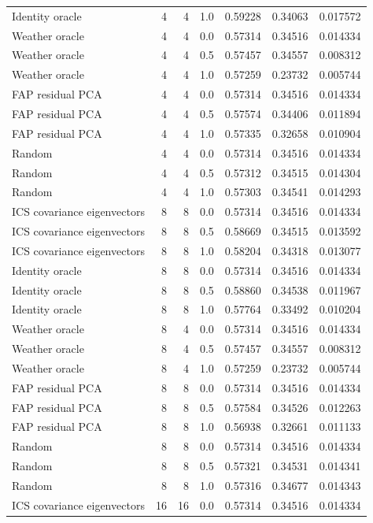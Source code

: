 \begin{tabular}{lrrrrrr}
Identity oracle & 4 & 4 & 1.0 & 0.59228 & 0.34063 & 0.017572 \\
Weather oracle & 4 & 4 & 0.0 & 0.57314 & 0.34516 & 0.014334 \\
Weather oracle & 4 & 4 & 0.5 & 0.57457 & 0.34557 & 0.008312 \\
Weather oracle & 4 & 4 & 1.0 & 0.57259 & 0.23732 & 0.005744 \\
FAP residual PCA & 4 & 4 & 0.0 & 0.57314 & 0.34516 & 0.014334 \\
FAP residual PCA & 4 & 4 & 0.5 & 0.57574 & 0.34406 & 0.011894 \\
FAP residual PCA & 4 & 4 & 1.0 & 0.57335 & 0.32658 & 0.010904 \\
Random & 4 & 4 & 0.0 & 0.57314 & 0.34516 & 0.014334 \\
Random & 4 & 4 & 0.5 & 0.57312 & 0.34515 & 0.014304 \\
Random & 4 & 4 & 1.0 & 0.57303 & 0.34541 & 0.014293 \\
ICS covariance eigenvectors & 8 & 8 & 0.0 & 0.57314 & 0.34516 & 0.014334 \\
ICS covariance eigenvectors & 8 & 8 & 0.5 & 0.58669 & 0.34515 & 0.013592 \\
ICS covariance eigenvectors & 8 & 8 & 1.0 & 0.58204 & 0.34318 & 0.013077 \\
Identity oracle & 8 & 8 & 0.0 & 0.57314 & 0.34516 & 0.014334 \\
Identity oracle & 8 & 8 & 0.5 & 0.58860 & 0.34538 & 0.011967 \\
Identity oracle & 8 & 8 & 1.0 & 0.57764 & 0.33492 & 0.010204 \\
Weather oracle & 8 & 4 & 0.0 & 0.57314 & 0.34516 & 0.014334 \\
Weather oracle & 8 & 4 & 0.5 & 0.57457 & 0.34557 & 0.008312 \\
Weather oracle & 8 & 4 & 1.0 & 0.57259 & 0.23732 & 0.005744 \\
FAP residual PCA & 8 & 8 & 0.0 & 0.57314 & 0.34516 & 0.014334 \\
FAP residual PCA & 8 & 8 & 0.5 & 0.57584 & 0.34526 & 0.012263 \\
FAP residual PCA & 8 & 8 & 1.0 & 0.56938 & 0.32661 & 0.011133 \\
Random & 8 & 8 & 0.0 & 0.57314 & 0.34516 & 0.014334 \\
Random & 8 & 8 & 0.5 & 0.57321 & 0.34531 & 0.014341 \\
Random & 8 & 8 & 1.0 & 0.57316 & 0.34677 & 0.014343 \\
ICS covariance eigenvectors & 16 & 16 & 0.0 & 0.57314 & 0.34516 & 0.014334 \\

\end{tabular}
